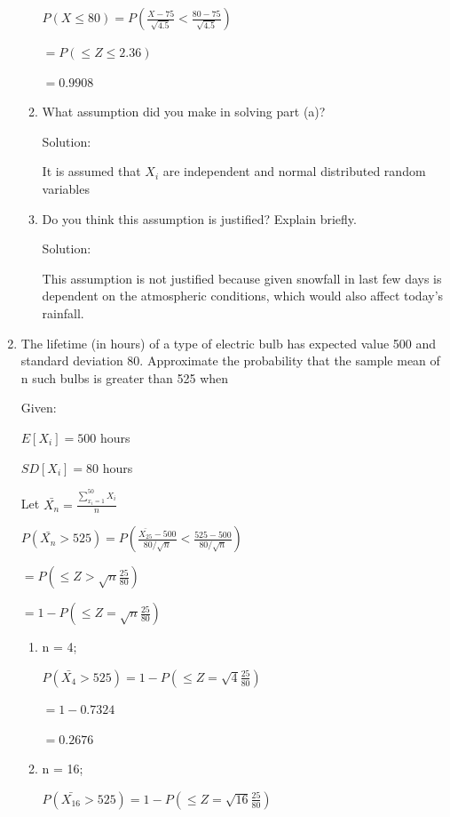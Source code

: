\documentclass{article}
\begin{document}
\begin{enumerate}
\begin{enumerate}
        $\displaystyle P(X \leq 80) = P\left(\frac{X - 75}{\sqrt{4.5}}<\frac{80 - 75}{\sqrt{4.5}}\right)$

        $= \displaystyle P\left(\leq Z \leq 2.36 \right)$
    
        $=0.9908$
        \item What assumption did you make in solving part (a)?
        
        Solution:

        It is assumed that $X_i$ are independent and normal distributed random variables
        
        \item Do you think this assumption is justified? Explain briefly.
        
        Solution:

        This assumption is not justified because given snowfall in last few days is dependent on the atmospheric conditions, which would also affect today's rainfall.
    \end{enumerate}
    \item  The lifetime (in hours) of a type of electric bulb has expected value 500 and standard deviation 80. 
    Approximate the probability that the sample mean of n such bulbs is greater than 525 when
       
    Given:

        $E[X_i] = 500$ hours

        $SD[X_i] = 80$ hours

        Let $\bar{X_n} = \displaystyle \frac{\sum_{x_i = 1}^{50} {X_i}}{n}$
    
        $\displaystyle P(\bar{X_n} > 525) = P\left(\frac{\bar{X_{25}} - 500}{80/\sqrt{n}}<\frac{525 - 500}{80/\sqrt{n}}\right)$

        $= \displaystyle P\left(\leq Z > \sqrt{n}\frac{25}{80}\right)$
    
        $=1 - P\left(\leq Z = \sqrt{n}\frac{25}{80}\right)$

    \begin{enumerate}
        \item n = 4;

         $\displaystyle P(\bar{X_4} > 525) = 1 - P\left(\leq Z = \sqrt{4}\frac{25}{80}\right)$
         
         $= 1 - 0.7324$

         $= 0.2676$

        \item n = 16;

        $\displaystyle P(\bar{X_16} > 525) = 1 - P\left(\leq Z = \sqrt{16}\frac{25}{80}\right)$
        

\end{enumerate}
\end{enumerate}
\end{document}
